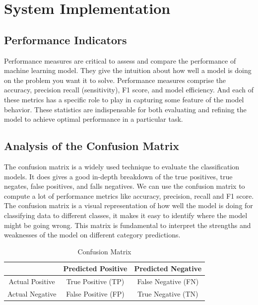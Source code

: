  


\section{System Implementation}
\subsection{Performance Indicators}


Performance measures are critical to assess and compare the performance of machine learning model. They give the intuition about how well a model is doing on the problem you want it to solve. Performance measures comprise the accuracy, precision recall (sensitivity), F1 score, and model efficiency. And each of these metrics has a specific role to play in capturing some feature of the model behavior. These statistics are indispensable for both evaluating and refining the model to achieve optimal performance in a particular task.


\subsection{Analysis of the Confusion Matrix} 
The confusion matrix is a widely used technique to evaluate the classification models. It does gives a good in-depth breakdown of the true positives, true negates, false positives, and falls negatives. We can use the confusion matrix to compute a lot of performance metrics like accuracy, precision, recall and F1 score. The confusion matrix is a visual representation of how well the model is doing for classifying data to different classes, it makes it easy to identify where the model might be going wrong. This matrix is fundamental to interpret the strengths and weaknesses of the model on different category predictions.

 

\begin{table}[h!]
\centering
\begin{tabular}{|c|c|c|}
\hline
                & Predicted Positive & Predicted Negative \\ \hline
Actual Positive & True Positive (TP) & False Negative (FN) \\ \hline
Actual Negative & False Positive (FP) & True Negative (TN) \\ \hline
\end{tabular}
\caption{Confusion Matrix}
\label{tab:confusion_matrix}
\end{table}


